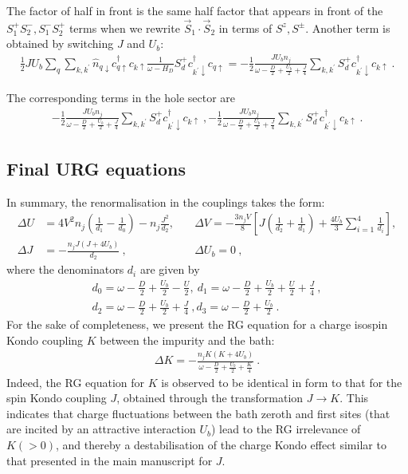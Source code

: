 \documentclass{iopart}
\begin{document}
The factor of half in front is the same half factor that appears in front of the \(S_1^+ S_2^-, S_1^-S_2^+\) terms when we rewrite \(\vec{S}_1\cdot\vec{S}_2\) in terms of \(S^z, S^\pm\). Another term is obtained by switching \(J\) and \(U_b\):
\begin{eqnarray}
	\frac{1}{2} J U_b \sum_{q} \sum_{k,k^\prime} \hat n_{q \downarrow} c^\dagger_{q \uparrow} c_{k \uparrow} \frac{1}{\omega - H_D}S_d^+ c^\dagger_{k^\prime \downarrow} c_{q \uparrow} = -\frac{1}{2}\frac{J U_b n_j}{\omega - \frac{D}{2} + \frac{U_b}{2} + \frac{J}{4}} \sum_{k,k^\prime} S_d^+ c^\dagger_{k^\prime \downarrow} c_{k \uparrow}~.
\end{eqnarray}

The corresponding terms in the hole sector are
\begin{eqnarray}
	-\frac{1}{2}\frac{J U_b n_j}{\omega - \frac{D}{2} + \frac{U_b}{2} + \frac{J}{4}} \sum_{k,k^\prime} S_d^+ c^\dagger_{k^\prime \downarrow} c_{k \uparrow}~, -\frac{1}{2}\frac{J U_b n_j}{\omega - \frac{D}{2} + \frac{U_b}{2} + \frac{J}{4}} \sum_{k,k^\prime} S_d^+ c^\dagger_{k^\prime \downarrow} c_{k \uparrow}~.
\end{eqnarray}

\subsection{Final URG equations}
In summary, the renormalisation in the couplings takes the form:
\begin{eqnarray}
	\Delta U &= 4V^2 n_j\left(\frac{1}{d_1} - \frac{1}{d_0}\right) - n_j\frac{J^2}{d_2},\quad &\Delta V = -\frac{3n_j V}{8}\left[J\left(\frac{1}{d_2} + \frac{1}{d_1}\right) +  \frac{4U_b}{3}\sum_{i=1}^4 \frac{1}{d_i}\right],\nonumber \\
	\Delta J &= -\frac{n_j J\left(J + 4U_b\right)}{d_2}~,\quad &\Delta U_b = 0\label{rg-eqn}~,
\end{eqnarray}
where the denominators \(d_i\) are given by
\begin{eqnarray}\label{rg-eqtn1}
	d_0 = \omega - \frac{D}{2} + \frac{U_b}{2} - \frac{U}{2},~d_1 = \omega - \frac{D}{2} + \frac{U_b}{2} + \frac{U}{2} + \frac{J}{4}~,\\
	d_2 = \omega - \frac{D}{2} + \frac{U_b}{2} + \frac{J}{4}~,d_3 = \omega - \frac{D}{2} + \frac{U_b}{2}~.
\end{eqnarray}
For the sake of completeness, we present the RG equation for a charge isospin Kondo coupling $K$ between the impurity and the bath: 
\begin{eqnarray}
\Delta K = -\frac{n_j K\left(K + 4U_b\right)}{\omega - \frac{D}{2} + \frac{U_b}{2} + \frac{K}{4}}~.
\end{eqnarray}
Indeed, the RG equation for $K$ is observed to be identical in form to that for the spin Kondo coupling $J$, obtained through the transformation \(J \to K\). This indicates that charge fluctuations between the bath zeroth and first sites (that are incited by an attractive interaction $U_{b}$) lead to the RG irrelevance of $K (>0)$, and thereby a destabilisation of the charge Kondo effect similar to that presented in the main manuscript for $J$.
\end{document}
